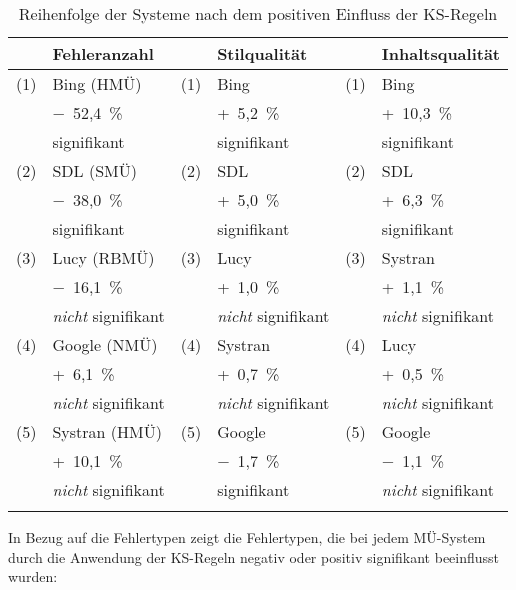 \begin{table}

\begin{tabularx}{\textwidth}{lXlXlX}
\lsptoprule
 & \textbf{Fehleranzahl} & & \textbf{Stilqualität} & & \textbf{Inhaltsqualität}\\
\midrule
(1) & Bing (HMÜ) & (1) & Bing  & (1) & Bing \\
 & $-$~52,4~\% &  &  +~5,2~\%  & &  +~10,3~\% \\
 & signifikant &  &  signifikant &  &  signifikant\\
(2) & SDL (SMÜ) & (2) & SDL  & (2) & SDL \\
 &  $-$~38,0~\%  &  &  +~5,0~\% &  &  +~6,3~\% \\
 & signifikant &  & signifikant & &  signifikant\\
(3) & Lucy (RBMÜ) & (3) & Lucy  & (3) & Systran \\
 & $-$~16,1~\%  &  &  +~1,0~\% &  &  +~1,1~\% \\
 & \textit{nicht} signifikant &  &\textit{nicht} signifikant &  &  \textit{nicht} signifikant\\
(4) & Google (NMÜ)  & (4) & Systran & (4) & Lucy \\
 & +~6,1~\%  &  &  +~0,7~\%  &  &  +~0,5~\% \\
 & \textit{nicht} signifikant &  & \textit{nicht} signifikant &  &  \textit{nicht} signifikant\\
(5) & Systran (HMÜ)  & (5) & Google  & (5) & Google \\
 &  +~10,1~\%  &  &  $-$~1,7~\%  &  &  $-$~1,1~\% \\
 &  \textit{nicht} signifikant &  & signifikant &  & \textit{nicht} signifikant\\
\lspbottomrule
\end{tabularx}
\caption{\label{tab:06:103}Reihenfolge der Systeme nach dem positiven Einfluss der KS-Regeln}
\end{table}


In Bezug auf die Fehlertypen zeigt  die Fehlertypen, die bei jedem MÜ-System durch die Anwendung der KS{}-Regeln negativ oder positiv signifikant beeinflusst wurden:


